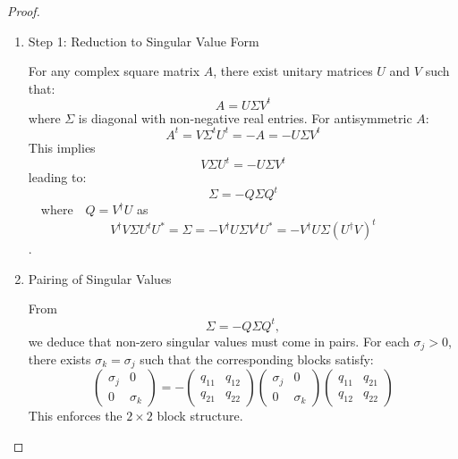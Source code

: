 \begin{theorem}
\begin{proof}
\begin{enumerate}
\item Step 1: Reduction to Singular Value Form

For any complex square matrix $A$, there exist unitary matrices $U$ and $V$
such that: 
\begin{equation}
A=U\Sigma V^{t}
\end{equation}%
where $\Sigma $ is diagonal with non-negative real entries. For
antisymmetric $A$: 
\begin{equation}
A^{t}=V\Sigma ^{t}U^{t}=-A=-U\Sigma V^{t}
\end{equation}%
This implies 
\begin{equation}
V\Sigma U^{t}=-U\Sigma V^{t}
\end{equation}%
leading to: 
\begin{equation}
\Sigma =-Q\Sigma Q^{t}
\end{equation}%
$\quad $where$\quad Q=V^{\dagger }U$ as 
\begin{equation}
V^{\dagger }V\Sigma U^{t}U^{\ast }=\Sigma =-V^{\dagger }U\Sigma V^{t}U^{\ast
}=-V^{\dagger }U\Sigma \left( U^{\dagger }V\right) ^{t}
\end{equation}%
$.$

\item Pairing of Singular Values 

From 
\begin{equation}
\Sigma =-Q\Sigma Q^{t},
\end{equation}%
we deduce that non-zero singular values must come in pairs. For each $\sigma
_{j}>0$, there exists $\sigma _{k}=\sigma _{j}$ such that the corresponding
blocks satisfy: 
\begin{equation}
\begin{pmatrix}
\sigma _{j} & 0 \\ 
0 & \sigma _{k}%
\end{pmatrix}%
=-%
\begin{pmatrix}
q_{11} & q_{12} \\ 
q_{21} & q_{22}%
\end{pmatrix}%
\begin{pmatrix}
\sigma _{j} & 0 \\ 
0 & \sigma _{k}%
\end{pmatrix}%
\begin{pmatrix}
q_{11} & q_{21} \\ 
q_{12} & q_{22}%
\end{pmatrix}%
\end{equation}%
This enforces the $2\times 2$ block structure.


\end{enumerate}
\end{proof}
\end{theorem}

